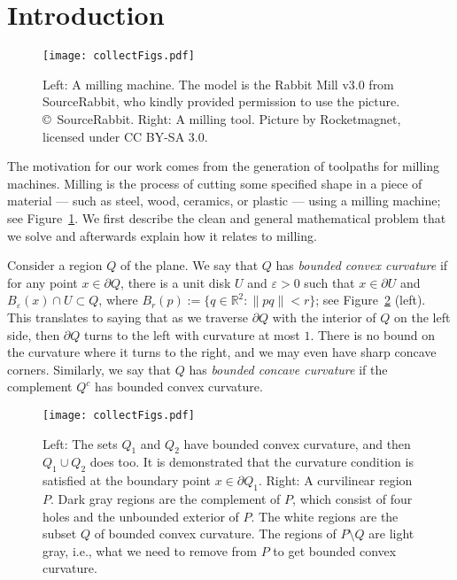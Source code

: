 \documentclass{article}
\newcommand{\RR}{\mathbb R}
\newcommand{\PP}{P}
\newcommand{\QQ}{Q}
\newcommand{\ee}{\varepsilon}
\newcommand{\mydef}{:=}
\begin{document}
\section{Introduction}\label{introSec}


\begin{figure}
\centering
\texttt{[image: collectFigs.pdf]}
\caption{Left: A milling machine.
The model is the Rabbit Mill v3.0 from SourceRabbit, who kindly provided permission to use the picture.
\copyright\ SourceRabbit.
Right: A milling tool. Picture by Rocketmagnet, licensed under CC BY-SA 3.0.}
\label{millFig}
\end{figure}

The motivation for our work comes from the generation of toolpaths for milling machines.
Milling is the process of cutting some specified shape in a piece of material --- such as steel, wood, ceramics, or plastic --- using a milling machine; see Figure~\ref{millFig}.
We first describe the clean and general mathematical problem that we solve and afterwards explain how it relates to milling.

Consider a region $\QQ$ of the plane. 
We say that $\QQ$ has \emph{bounded convex curvature} if for any point $x\in\partial\QQ$, there is a unit disk $U$ and $\ee>0$ such that $x\in \partial U$ and $B_\ee(x)\cap U\subset\QQ$, where $B_r(p)\mydef \{q\in\RR^2\colon \|pq\|<r\}$; see Figure~\ref{compositionFig} (left).
This translates to saying that as we traverse $\partial\QQ$ with the interior of $\QQ$ on the left side, then $\partial\QQ$ turns to the left with curvature at most $1$.
There is no bound on the curvature where it turns to the right, and we may even have
sharp concave corners.
Similarly, we say that $\QQ$ has \emph{bounded concave curvature} if the complement $\QQ^c$ has bounded convex curvature.

\begin{figure}
\centering
\texttt{[image: collectFigs.pdf]}
\caption{Left: The sets $\QQ_1$ and $\QQ_2$ have bounded convex curvature, and then $\QQ_1\cup\QQ_2$ does too.
It is demonstrated that the curvature condition is satisfied at the boundary point $x\in\partial\QQ_1$.
Right: A curvilinear region $\PP$.
Dark gray regions are the complement of $\PP$, which consist of four holes and the unbounded exterior of $\PP$.
The white regions are the subset $\QQ$ of bounded convex curvature.
The regions of $\PP\setminus\QQ$ are light gray, i.e., what we need to remove from $\PP$ to get bounded convex curvature.}
\label{compositionFig}
\end{figure}
\end{document}
